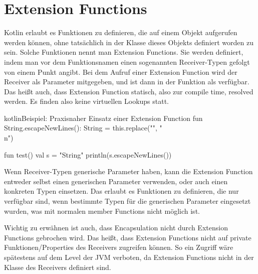 
\section{Extension Functions}\label{sec:extension-functions}

\renewcommand{\kapitelautor}{Autor: Marvin Kurka}

Kotlin erlaubt es Funktionen zu definieren, die auf einem Objekt aufgerufen werden können, ohne tatsächlich in der
Klasse dieses Objekts definiert worden zu sein.
Solche Funktionen nennt man Extension Functions.
Sie werden definiert, indem man vor dem Funktionsnamen einen sogenannten Receiver-Typen gefolgt von einem Punkt angibt.
Bei dem Aufruf einer Extension Function wird der Receiver als Parameter mitgegeben, und ist dann in der Funktion als
 verfügbar.
Das heißt auch, dass Extension Function statisch, also zur compile time, resolved werden.
Es finden also keine virtuellen Lookups statt.

\begin{codeBlock}{kotlin}{Beispiel: Praxisnaher Einsatz einer Extension Function}
fun String.escapeNewLines(): String = this.replace("\n", "\\n")

fun test() {
    val s = "String\nwith\nNewlines"
    println(s.escapeNewLines())
}
\end{codeBlock}

Wenn Receiver-Typen generische Parameter haben, kann die Extension Function entweder selbst einen generischen Parameter
verwenden, oder auch einen konkreten Typen einsetzen.
Das erlaubt es Funktionen zu definieren, die nur verfügbar sind, wenn bestimmte Typen für die generischen Parameter
eingesetzt wurden, was mit normalen member Functions nicht möglich ist.


Wichtig zu erwähnen ist auch, dass Encapsulation nicht durch Extension Functions gebrochen wird.
Das heißt, dass Extension Functions nicht auf private Funktionen/Properties des Receivers zugreifen können.
So ein Zugriff wäre spätestens auf dem Level der JVM verboten, da Extension Functions nicht in der Klasse des Receivers
definiert sind.

